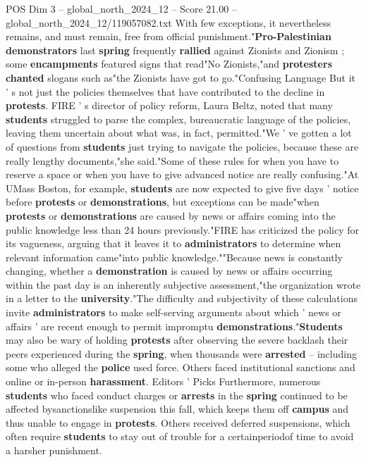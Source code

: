 \begin{textsample}{POS Dim 3 – global\_north\_2024\_12 – Score 21.00 – global\_north\_2024\_12/119057082.txt}
With few exceptions, it nevertheless remains, and must remain, free from official punishment."\textbf{Pro-Palestinian} \textbf{demonstrators} last \textbf{spring} frequently \textbf{rallied} against Zionists and Zionism ; some \textbf{encampments} featured signs that read"No Zionists,"and \textbf{protesters} \textbf{chanted} slogans such as"the Zionists have got to go."Confusing Language But it ' s not just the policies themselves that have contributed to the decline in \textbf{protests}.
FIRE ' s director of policy reform, Laura Beltz, noted that many \textbf{students} struggled to parse the complex, bureaucratic language of the policies, leaving them uncertain about what was, in fact, permitted."We ' ve gotten a lot of questions from \textbf{students} just trying to navigate the policies, because these are really lengthy documents,"she said."Some of these rules for when you have to reserve a space or when you have to give advanced notice are really confusing."At UMass Boston, for example, \textbf{students} are now expected to give five days ' notice before \textbf{protests} or \textbf{demonstrations}, but exceptions can be made"when \textbf{protests} or \textbf{demonstrations} are caused by news or affairs coming into the public knowledge less than 24 hours previously."FIRE has criticized the policy for its vagueness, arguing that it leaves it to \textbf{administrators} to determine when relevant information came"into public knowledge.""Because news is constantly changing, whether a \textbf{demonstration} is caused by news or affairs occurring within the past day is an inherently subjective assessment,"the organization wrote in a letter to the \textbf{university}."The difficulty and subjectivity of these calculations invite \textbf{administrators} to make self-serving arguments about which ' news or affairs ' are recent enough to permit impromptu \textbf{demonstrations}."\textbf{Students} may also be wary of holding \textbf{protests} after observing the severe backlash their peers experienced during the \textbf{spring}, when thousands were \textbf{arrested} -- including some who alleged the \textbf{police} used force.
Others faced institutional sanctions and online or in-person \textbf{harassment}.
Editors ' Picks Furthermore, numerous \textbf{students} who faced conduct charges or \textbf{arrests} in the \textbf{spring} continued to be affected bysanctionslike suspension this fall, which keeps them off \textbf{campus} and thus unable to engage in \textbf{protests}.
Others received deferred suspensions, which often require \textbf{students} to stay out of trouble for a certainperiodof time to avoid a harsher punishment.

\end{textsample}
